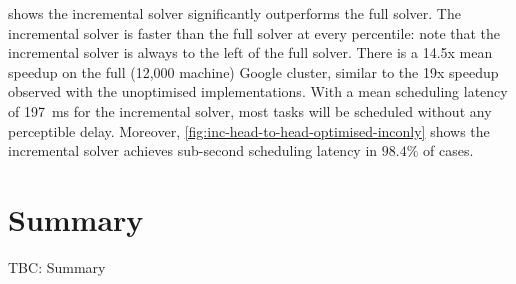  shows the incremental solver significantly outperforms the full solver. The incremental solver is faster than the full solver at every percentile: note that the incremental solver is always to the left of the full solver. There is a 14.5x mean speedup on the full (12,000 machine) Google cluster, similar to the 19x speedup observed with the unoptimised implementations\footnotemark. With a mean scheduling latency of \SI{197}{\milli\second} for the incremental solver, most tasks will be scheduled without any perceptible delay. Moreover, \cref{fig:inc-head-to-head-optimised-inconly} shows the incremental solver achieves sub-second scheduling latency in $98.4\%$ of cases.


%
%
%
%
%
%
%
%
%
%

\section{Summary}

TBC: Summary